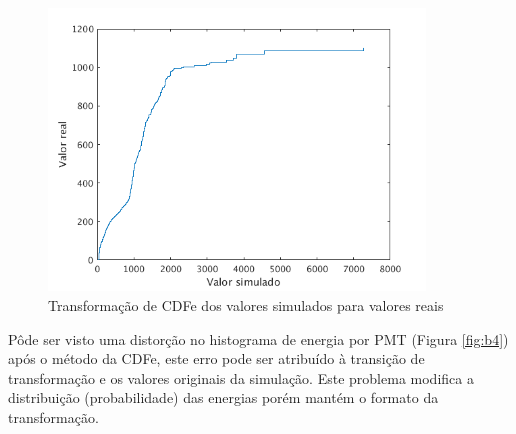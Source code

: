 \begin{figure}[H]
	\centering
	\includegraphics[width=10cm]{textuais/simulacao/figuras/cdfe.png}
	\caption{Transformação de CDFe dos valores simulados para valores reais }
	\label{fig:transf}
\end{figure}


Pôde ser visto uma distorção no histograma de energia por PMT (Figura \ref{fig:b4}) após o método da CDFe, este erro pode ser atribuído à transição de transformação e os valores originais da simulação. Este problema modifica a distribuição (probabilidade) das energias porém mantém o formato da transformação.